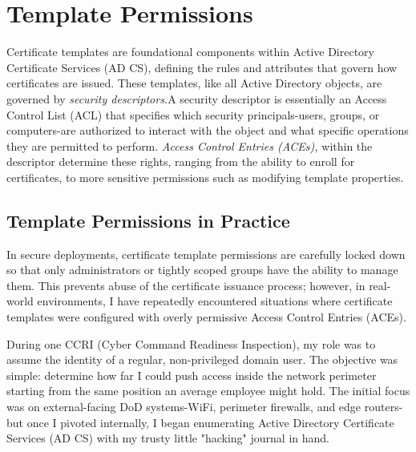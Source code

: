 {\begin{figure}
\end{figure}

\section{Template Permissions}
Certificate templates are foundational components within Active Directory Certificate Services (AD CS), defining the rules and attributes that govern how certificates are issued. These templates, like all Active Directory objects, are governed by \textit{security descriptors.}A security descriptor is essentially an Access Control List (ACL) that specifies which security principals-users, groups, or computers-are authorized to interact with the object and what specific operations they are permitted to perform. \textit{Access Control Entries (ACEs),} within the descriptor determine these rights, ranging from the ability to enroll for certificates, to more sensitive permissions such as modifying template properties.

\subsection{Template Permissions in Practice}
In secure deployments, certificate template permissions are carefully locked down so that only administrators or tightly scoped groups have the ability to manage them. This prevents abuse of the certificate issuance process; however, in real-world environments, I have repeatedly encountered situations where certificate templates were configured with overly permissive Access Control Entries (ACEs).

During one CCRI (Cyber Command Readiness Inspection), my role was to assume the identity of a regular, non-privileged domain user. The objective was simple: determine how far I could push access inside the network perimeter starting from the same position an average employee might hold. The initial focus was on external-facing DoD systems-WiFi, perimeter firewalls, and edge routers-but once I pivoted internally, I began enumerating Active Directory Certificate Services (AD CS) with my trusty little "hacking" journal in hand.

}
